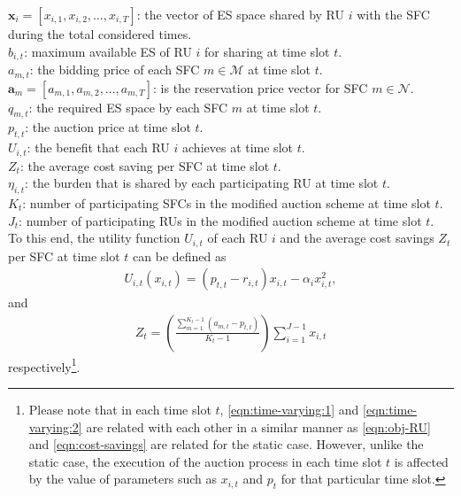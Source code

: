 \documentclass[journal,10pt]{IEEEtran}
\begin{document}
$\mathbf{x}_i = [x_{i,1}, x_{i,2},\hdots, x_{i,T}]$: the vector of ES space shared by RU $i$ with the SFC during the total considered times.\\
$b_{i,t}$: maximum available ES of RU $i$ for sharing at time slot $t$.\\
$a_{m,t}$: the bidding price of each SFC $m\in\mathcal{M}$ at time slot $t$.\\
$\mathbf{a}_m = [a_{m,1}, a_{m,2}, \hdots, a_{m,T}]$: is the reservation price vector for SFC $m\in\mathcal{N}$.\\
$q_{m,t}$: the required ES space by each SFC $m$ at time slot $t$.\\
$p_{t,t}$: the auction price at time slot $t$.\\
$U_{i,t}$: the benefit that each RU $i$ achieves at time slot $t$.\\
$Z_t$: the average cost saving per SFC at time slot $t$.\\
$\eta_{i,t}$: the burden that is shared by each participating RU at time slot $t$.\\
$K_t$: number of participating SFCs in the modified auction scheme at time slot $t$.\\
$J_t$: number of participating RUs in the modified auction scheme at time slot $t$.\\
To this end, the utility function $U_{i,t}$ of each RU $i$ and the average cost savings $Z_t$ per SFC at time slot $t$ can be defined as
\begin{eqnarray}
U_{i,t}(x_{i,t}) = (p_{t,t}-r_{i,t})x_{i,t} - \alpha_i x_{i,t}^2,
\label{eqn:time-varying:1}
\end{eqnarray}
and
\begin{eqnarray}
Z_t = \left(\frac{\sum_{m=1}^{K_t-1}(a_{m,t} - p_{t,t})}{K_t - 1}\right)\sum_{i=1}^{J-1}x_{i,t}
\label{eqn:time-varying:2}
\end{eqnarray}
respectively\footnote{Please note that in each time slot $t$, \eqref{eqn:time-varying:1} and \eqref{eqn:time-varying:2} are related with each other in a similar manner as \eqref{eqn:obj-RU} and \eqref{eqn:cost-savings} are related for the static case. However, unlike the static case, the execution of the auction process in each time slot $t$ is affected by the value of parameters such as $x_{i,t}$ and $p_t$ for that particular time slot.}. 
\end{document}
